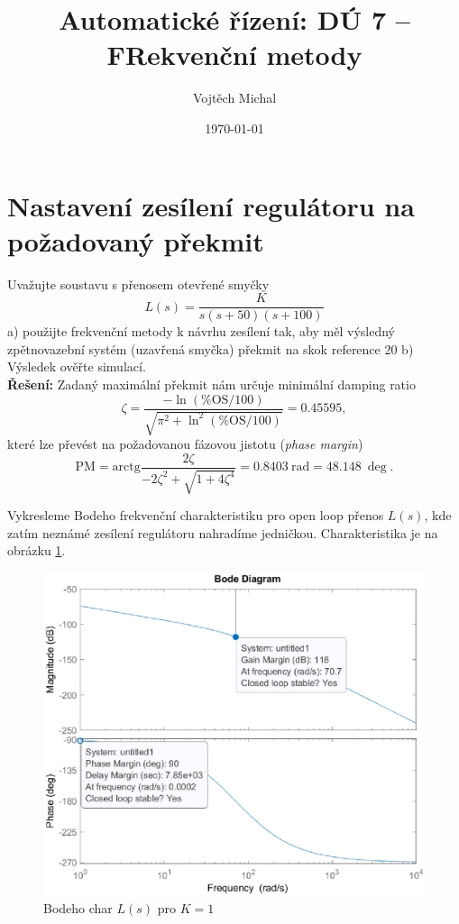 \documentclass[twoside]{article}
\title{Automatické řízení: DÚ 7 -- FRekvenční metody}
\author{Vojtěch Michal}
\date{\today}
\begin{document}
\maketitle

\section{Nastavení zesílení regulátoru na požadovaný překmit}
Uvažujte soustavu s přenosem otevřené smyčky
\begin{equation}
	L(s) = \frac{K}{s(s+50)(s+100)}
\end{equation}
a) použijte frekvenční metody k návrhu zesílení tak, aby měl výsledný zpětnovazební systém
(uzavřená smyčka) překmit na skok reference 20%
b) Výsledek ověřte simulací. \\
\textbf{Řešení:}
Zadaný maximální překmit nám určuje minimální damping ratio
\begin{equation}
	\zeta = \frac{-\ln(\text{\%OS}/100)}{\sqrt{\pi^2 + \ln^2(\text{\%OS}/100)}} = 0.45595,
\end{equation}
které lze převést na požadovanou fázovou jistotu (\textit{phase margin})
\begin{equation}
	\text{PM} = \text{arctg} \frac{ 2 \zeta}{-2\zeta^2 + \sqrt{1 + 4 \zeta^4}} = 0.8403~\text{rad} = 48.148~\deg.
\end{equation}

Vykresleme Bodeho frekvenční charakteristiku pro open loop přenos $L(s)$, kde zatím neznámé zesílení regulátoru
nahradíme jedničkou. Charakteristika je na obrázku \ref{fig:bode_unity_gain}.

\begin{figure}
	\includegraphics[width=\linewidth]{bode_unity_gain.eps}
	\caption{Bodeho char $L(s)$ pro $K=1$}
	\label{fig:bode_unity_gain}
\end{figure}
\end{document}

